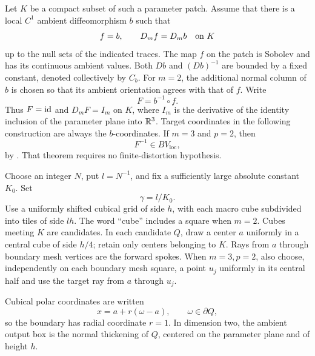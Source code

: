 Let $K$ be a compact subset of such a parameter patch.  Assume that
there is a local $C^1$ ambient diffeomorphism $b$ such that
\begin{equation}\label{la:identity-jets}
 f=b,\qquad D_m f=D_m b\quad\hbox{on }K
\end{equation}
up to the null sets of the indicated traces.  The map $f$ on the patch
is Sobolev and has its continuous ambient values.  Both $Db$ and
$(Db)^{-1}$ are bounded by a fixed constant, denoted collectively by
$C_b$.  For $m=2$, the additional normal column of $b$ is chosen so
that its ambient orientation agrees with that of $f$.
Write
\[
 F=b^{-1}\circ f.
\]
Thus $F=\operatorname{id}$ and $D_mF=I_m$ on $K$, where $I_m$ is the derivative
of the identity inclusion of the parameter plane into $\mathbb R^3$.
Target coordinates in the following construction are always the
$b$-coordinates.  If $m=3$ and $p=2$, then
\begin{equation}\label{la:inverse-bv}
 F^{-1}\in BV_{\mathrm{loc}},
\end{equation}
by \cite[Theorem~1.1]{CsornyeiHenclMaly2010}.  That theorem requires no
finite-distortion hypothesis.

Choose an integer $N$, put $l=N^{-1}$, and fix a sufficiently large
absolute constant $K_0$.  Set
\begin{equation}\label{la:gamma}
 \gamma=l/K_0.
\end{equation}
Use a uniformly shifted cubical grid of side $h$, with each macro cube
subdivided into tiles of side $lh$.  The word ``cube'' includes a
square when $m=2$.  Cubes meeting $K$ are candidates.  In each candidate
$Q$, draw a center $a$ uniformly in a central cube of side $h/4$; retain
only centers belonging to $K$.  Rays from $a$ through boundary mesh
vertices are the forward spokes.  When $m=3,p=2$, also choose,
independently on each boundary mesh square, a point $u_j$ uniformly in
its central half and use the target ray from $a$ through $u_j$.

Cubical polar coordinates are written
\[
 x=a+r(\omega-a),\qquad \omega\in\partial Q,
\]
so the boundary has radial coordinate $r=1$.  In dimension two, the
ambient output box is the normal thickening of $Q$, centered on the
parameter plane and of height $h$.

